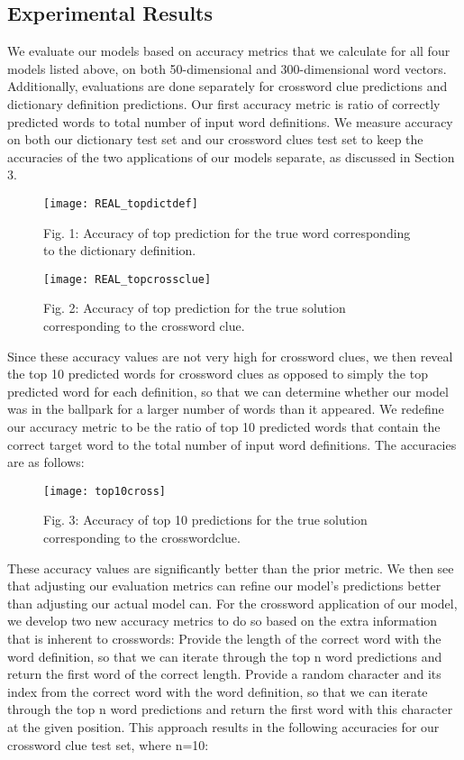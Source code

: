 \documentclass{article} %
\begin{document}
\subsection{Experimental Results}
We evaluate our models based on accuracy metrics that we calculate for all four models listed above, on both 50-dimensional and 300-dimensional word vectors. Additionally, evaluations are done separately for crossword clue predictions and dictionary definition predictions.
Our first accuracy metric is ratio of correctly predicted words to total number of input word definitions. We measure accuracy on both our dictionary test set and our crossword clues test set to keep the accuracies of the two applications of our models separate, as discussed in Section 3.

\begin{figure}
	\texttt{[image: REAL\_topdictdef]}
	\caption{Fig. 1: Accuracy of top prediction for the true word corresponding to the dictionary definition.}
\end{figure}

\begin{figure}
	\texttt{[image: REAL\_topcrossclue]}
	\caption{Fig. 2: Accuracy of top prediction for the true solution corresponding to the crossword clue.}
\end{figure}

Since these accuracy values are not very high for crossword clues, we then reveal the top 10 predicted words for crossword clues as opposed to simply the top predicted word for each definition, so that we can determine whether our model was in the ballpark for a larger number of words than it appeared. We redefine our accuracy metric to be the ratio of top 10 predicted words that contain the correct target word to the total number of input word definitions. The accuracies are as follows:

\begin{figure}
	\texttt{[image: top10cross]}
	\caption{Fig. 3: Accuracy of top 10 predictions for the true solution corresponding to the crosswordclue.}
\end{figure}

These accuracy values are significantly better than the prior metric. We then see that adjusting our evaluation metrics can refine our model’s predictions better than adjusting our actual model can. For the crossword application of our model, we develop two new accuracy metrics to do so based on the extra information that is inherent to crosswords:
Provide the length of the correct word with the word definition, so that we can iterate through the top n word predictions and return the first word of the correct length.
Provide a random character and its index from the correct word with the word definition, so that we can iterate through the top n word predictions and return the first word with this character at the given position. 
This approach results in the following accuracies for our crossword clue test set, where n=10:
\end{document}
